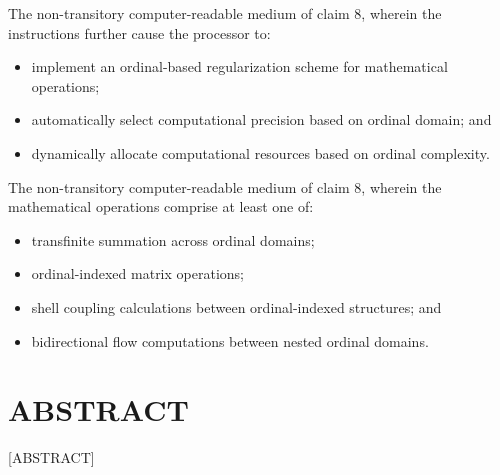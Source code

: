 \documentclass[12pt,letterpaper]{article}
\begin{document}
\begin{patentclaims}
    \item The non-transitory computer-readable medium of claim 8, wherein the instructions further cause the processor to:
    \begin{itemize}[leftmargin=2em]
        \item implement an ordinal-based regularization scheme for mathematical operations;
        \item automatically select computational precision based on ordinal domain; and
        \item dynamically allocate computational resources based on ordinal complexity.
    \end{itemize}
    
    \item The non-transitory computer-readable medium of claim 8, wherein the mathematical operations comprise at least one of:
    \begin{itemize}[leftmargin=2em]
        \item transfinite summation across ordinal domains;
        \item ordinal-indexed matrix operations;
        \item shell coupling calculations between ordinal-indexed structures; and
        \item bidirectional flow computations between nested ordinal domains.
    \end{itemize}
\end{patentclaims}

\newpage
\section*{ABSTRACT}

[ABSTRACT]
\end{document}
